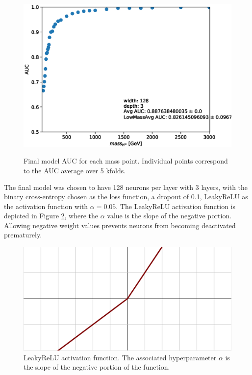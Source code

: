 			\clearpage
			\begin{figure}
			  \centering
			  \includegraphics[width=\textwidth,keepaspectratio=true]{chapters/chapter6_Hplus/images/AUC_Plots/model_GB_1024_channel_taulep_mass_80to3000_ntracks_1_nfolds_5_fold_4_nvars_19_batch_size_1024_epochs_1000_dense_layer_size_128_activation_function_LeakyRelu_depth_3_loss_binary_crossentropy_dropout_0.1_alpha_0.05.eps}\\
			  \caption{Final model \gls{AUC} for each mass point. Individual points correspond to the \gls{AUC} average over 5 kfolds. }
			  \label{fig:final-auc}
			\end{figure}

			The final model was chosen to have 128 neurons per layer with 3 layers, with the binary cross-entropy chosen as the loss function, a dropout of 0.1, LeakyReLU as the activation function with $\alpha=0.05$. The LeakyReLU activation function is depicted in Figure \ref{fig:leaky-relu}, where the $\alpha$ value is the slope of the negative portion. Allowing negative weight values prevents neurons from becoming deactivated prematurely.

			\begin{figure}
				\centering
				\includegraphics[width=.4\textwidth,keepaspectratio=true]{chapters/chapter6_HPlus/images/Activation_prelu.svg.png}
				\caption{LeakyReLU activation function. The associated hyperparameter $\alpha$ is the slope of the negative portion of the function.}
				\label{fig:leaky-relu}
			\end{figure}

